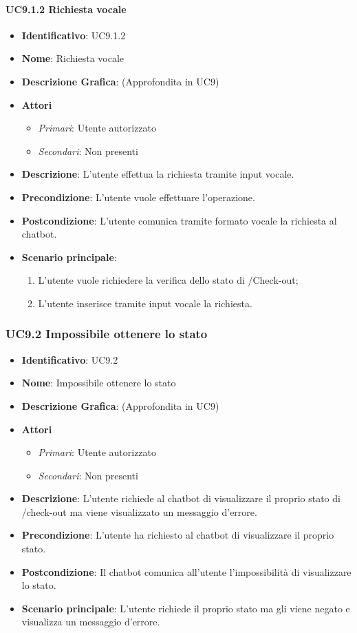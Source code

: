 \paragraph{UC9.1.2 Richiesta vocale}
\begin{itemize}
	\item \textbf{Identificativo}: UC9.1.2
	\item \textbf{Nome}: Richiesta vocale
	\item \textbf{Descrizione Grafica}: (Approfondita in UC9)
	\item \textbf{Attori}
	\begin{itemize}
		\item \textit{Primari}: Utente autorizzato
		\item \textit{Secondari}: Non presenti
	\end{itemize}
	\item \textbf{Descrizione}: L'utente effettua la richiesta tramite input vocale.
	\item \textbf{Precondizione}: L'utente vuole effettuare l'operazione.
	\item \textbf{Postcondizione}: L'utente comunica tramite formato vocale la richiesta al chatbot.
	\item \textbf{Scenario principale}: 
	\begin{enumerate}
		\item L'utente vuole richiedere la verifica dello stato di /Check-out;
		\item L'utente inserisce tramite input vocale la richiesta.
	\end{enumerate}
\end{itemize}

\subsubsection{UC9.2 Impossibile ottenere lo stato}
\begin{itemize}
	\item \textbf{Identificativo}: UC9.2
	\item \textbf{Nome}: Impossibile ottenere lo stato
	\item \textbf{Descrizione Grafica}: (Approfondita in UC9)
	\item \textbf{Attori}
	\begin{itemize}
		\item \textit{Primari}: Utente autorizzato
		\item \textit{Secondari}: Non presenti
	\end{itemize}
	\item \textbf{Descrizione}: L'utente richiede al chatbot di visualizzare il proprio stato di /check-out ma viene visualizzato un messaggio d'errore.
	\item \textbf{Precondizione}: L'utente ha richiesto al chatbot di visualizzare il proprio stato.
	\item \textbf{Postcondizione}: Il chatbot comunica all'utente l'impossibilità di visualizzare lo stato.
	\item \textbf{Scenario principale}: L'utente richiede il proprio stato ma gli viene negato e visualizza un messaggio d'errore.
\end{itemize}
\newpage